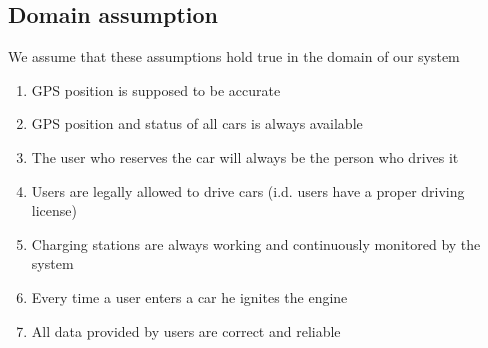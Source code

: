 \subsection{Domain assumption}
	We assume that these assumptions hold true in the domain of our system 
	\begin{enumerate}[label=\textbf{DA\arabic*}]
		\item GPS position is supposed to be accurate
		\item GPS position and status of all cars is always available
		\item The user who reserves the car will always be the person who drives it
		\item Users are legally allowed to drive cars (i.d. users have a proper driving license)
		\item Charging stations are always working and continuously monitored by the system
		\item {}Every time a user enters a car he ignites the engine
		\item All data provided by users are correct and reliable
	\end{enumerate}